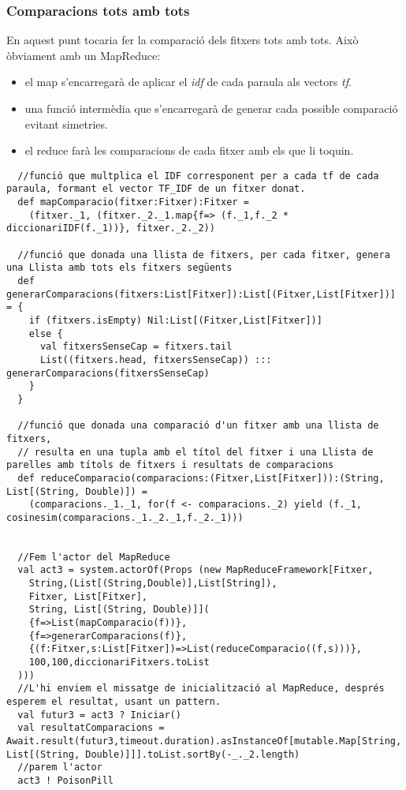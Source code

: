 \documentclass[11pt,a4paper,twoside]{report}
\begin{document}
\subsubsection{Comparacions tots amb tots}

En aquest punt tocaria fer la comparació dels fitxers tots amb tots. Això òbviament amb un MapReduce:
\begin{itemize}
  \item el map s'encarregarà de aplicar el \textit{idf} de cada paraula als vectors \textit{tf}.
  \item una funció intermèdia que s'encarregarà de generar cada possible comparació evitant simetries.
  \item el reduce farà les comparacions de cada fitxer amb els que li toquin.
\end{itemize}

\begin{lstlisting}
  //funció que multplica el IDF corresponent per a cada tf de cada paraula, formant el vector TF_IDF de un fitxer donat.
  def mapComparacio(fitxer:Fitxer):Fitxer =
    (fitxer._1, (fitxer._2._1.map{f=> (f._1,f._2 * diccionariIDF(f._1))}, fitxer._2._2))

  //funció que donada una llista de fitxers, per cada fitxer, genera una Llista amb tots els fitxers següents
  def generarComparacions(fitxers:List[Fitxer]):List[(Fitxer,List[Fitxer])] = {
    if (fitxers.isEmpty) Nil:List[(Fitxer,List[Fitxer])]
    else {
      val fitxersSenseCap = fitxers.tail
      List((fitxers.head, fitxersSenseCap)) ::: generarComparacions(fitxersSenseCap)
    }
  }

  //funció que donada una comparació d'un fitxer amb una llista de fitxers,
  // resulta en una tupla amb el títol del fitxer i una Llista de parelles amb títols de fitxers i resultats de comparacions
  def reduceComparacio(comparacions:(Fitxer,List[Fitxer])):(String, List[(String, Double)]) =
    (comparacions._1._1, for(f <- comparacions._2) yield (f._1, cosinesim(comparacions._1._2._1,f._2._1)))


  //Fem l'actor del MapReduce
  val act3 = system.actorOf(Props (new MapReduceFramework[Fitxer,
    String,(List[(String,Double)],List[String]),
    Fitxer, List[Fitxer],
    String, List[(String, Double)]](
    {f=>List(mapComparacio(f))},
    {f=>generarComparacions(f)},
    {(f:Fitxer,s:List[Fitxer])=>List(reduceComparacio((f,s)))},
    100,100,diccionariFitxers.toList
  )))
  //L'hi enviem el missatge de inicialització al MapReduce, després esperem el resultat, usant un pattern.
  val futur3 = act3 ? Iniciar()
  val resultatComparacions = Await.result(futur3,timeout.duration).asInstanceOf[mutable.Map[String, List[(String, Double)]]].toList.sortBy(-_._2.length)
  //parem l'actor
  act3 ! PoisonPill
\end{lstlisting}
\end{document}
